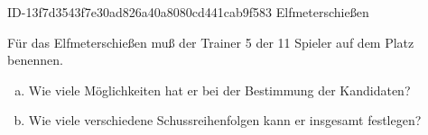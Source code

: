 \begin{exercise}
      {ID-13f7d3543f7e30ad826a40a8080cd441cab9f583}
      {Elfmeterschießen}
  \ifproblem\problem\par
    Für das Elfmeterschießen muß der Trainer 5 der 11 Spieler auf dem Platz
    benennen.
    \begin{enumerate}[a)]
      \item Wie viele Möglichkeiten hat er bei der Bestimmung der Kandidaten?
      \item Wie viele verschiedene Schussreihenfolgen kann er insgesamt festlegen?
    \end{enumerate}
  \fi
\end{exercise}
